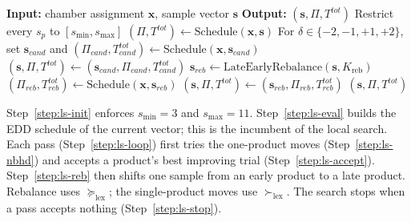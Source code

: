 \begin{algorithm}[H]
\caption{SampleSizeLocalSearch}
\label{alg:sample_ls}
\begin{algorithmic}[1]
\State \textbf{Input:} chamber assignment \(\mathbf{x}\), sample vector \(\mathbf{s}\)
\State \textbf{Output:} \((\mathbf{s},\Pi,T^{tot})\)
\State Restrict every \(s_p\) to \([s_{\min},s_{\max}]\) \label{step:ls-init}
\State \((\Pi,T^{tot})\leftarrow\text{Schedule}(\mathbf{x},\mathbf{s})\) \label{step:ls-eval}
\Repeat \label{step:ls-loop}
        \State For \(\delta\in\{-2,-1,+1,+2\}\), set \(\mathbf{s}_{cand}\) and \((\Pi_{cand},T^{tot}_{cand})\leftarrow\mathrm{Schedule}(\mathbf{x},\mathbf{s}_{cand})\) \label{step:ls-nbhd}
         \label{step:ls-accept}
            \State \((\mathbf{s},\Pi,T^{tot})\leftarrow(\mathbf{s}_{cand},\Pi_{cand},T^{tot}_{cand})\)
        \EndIf
    \EndFor
    \State \(\mathbf{s}_{reb}\leftarrow\text{LateEarlyRebalance}(\mathbf{s},K_{\mathrm{reb}})\) \label{step:ls-reb}
    \State \((\Pi_{reb},T^{tot}_{reb})\leftarrow\mathrm{Schedule}(\mathbf{x},\mathbf{s}_{reb})\)
        \State \((\mathbf{s},\Pi,T^{tot})\leftarrow(\mathbf{s}_{reb},\Pi_{reb},T^{tot}_{reb})\)
    \EndIf
{} \label{step:ls-stop}
\State \Return \((\mathbf{s},\Pi,T^{tot})\)
\end{algorithmic}
\end{algorithm}

Step~\ref{step:ls-init} enforces \(s_{\min}=3\) and \(s_{\max}=11\).
Step~\ref{step:ls-eval} builds the EDD schedule of the current
vector; this is the incumbent of the local search.
Each pass (Step~\ref{step:ls-loop}) first tries the one-product
moves (Step~\ref{step:ls-nbhd}) and accepts a product's best
improving trial (Step~\ref{step:ls-accept}).
Step~\ref{step:ls-reb} then shifts one sample from an early product
to a late product.
Rebalance uses \(\succeq_{\mathrm{lex}}\); the single-product moves use
\(\succ_{\mathrm{lex}}\).
The search stops when a pass accepts nothing
(Step~\ref{step:ls-stop}).
